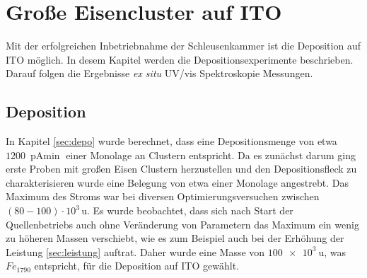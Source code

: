 \chapter{Große Eisencluster auf ITO}
Mit der erfolgreichen Inbetriebnahme der Schleusenkammer ist die Deposition auf ITO möglich. In desem Kapitel werden die Depositionsexperimente beschrieben.
Darauf folgen die Ergebnisse \textit{ex situ} UV/vis Spektroskopie Messungen. 


\section{Deposition}
\label{sec:depoauswertung}
In Kapitel \ref{sec:depo} wurde berechnet, dass eine Depositionsmenge von etwa $\SI{1200}{\pA\min}$ einer Monolage an Clustern entspricht.
Da es zunächst darum ging erste Proben mit großen Eisen Clustern herzustellen und den Depositionsfleck zu charakterisieren wurde eine Belegung von etwa einer Monolage angestrebt. 
Das Maximum des Stroms war bei diversen Optimierungsversuchen zwischen $(80-100)\cdot 10^3\,\text{u}$.
Es wurde beobachtet, dass sich nach Start der Quellenbetriebs auch ohne Veränderung von Parametern das Maximum ein wenig zu höheren Massen verschiebt, wie es zum Beispiel auch bei der Erhöhung der Leistung \ref{sec:leistung} auftrat.
Daher wurde eine Masse von $\SI{100e3}{\amu}$, was $Fe_{1790}$ entspricht, für die Deposition auf ITO gewählt.\\

